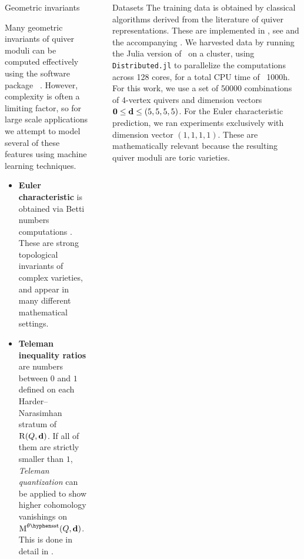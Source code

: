 \documentclass[final,20pt]{beamer}
\newlength{\sepwidth}
\newlength{\colwidth}
\newcommand{\separatorcolumn}{\begin{column}{\sepwidth}\end{column}}
\begin{document}
\begin{frame}[t]
\begin{columns}[t]
\begin{column}{\colwidth}
  \begin{alertblock}{Geometric invariants}

    Many geometric invariants of quiver moduli can be computed effectively
    using the software package \quivertools~\cite{quivertools,2506.19432}.
    However, complexity is often a limiting factor,
    so for large scale applications we attempt to model
    several of these features using machine learning techniques.

    \begin{itemize}
      \item \textbf{Euler characteristic} is obtained
      via Betti numbers computations \cite{MR1974891}.
      These are strong topological invariants of complex varieties,
      and appear in many different mathematical settings.

      \item \textbf{Teleman inequality ratios} are numbers between $0$ and $1$ defined
      on each Harder--Narasimhan stratum of $\operatorname{R}(Q,\mathbf{d})$.
      If all of them are strictly smaller than $1$,
      \emph{Teleman quantization} can be applied to show higher cohomology vanishings
      on $\modulispace^{\theta\semistable}(Q,\tuple{d})$.
      This is done in detail in \cite{2311.17003}.
    \end{itemize}

  \end{alertblock}
\end{column}

\separatorcolumn

\begin{column}{\colwidth}


  \begin{block}{Datasets}
    The training data is obtained by classical algorithms derived from
    the literature of quiver representations. These are implemented in
    \quivertools, see \cite{quivertools} and the accompanying \cite{2506.19432}.
    We harvested data by running the Julia version of \quivertools~on a cluster,
    using {\tt{Distributed.jl}} to parallelize the computations across 128 cores,
    for a total CPU time of ~1000h.
    For this work, we use a set of 50000 combinations of 4-vertex quivers
    and dimension vectors $\mathbf{0} \leq \mathbf{d}\leq(5, 5, 5, 5)$.
    For the Euler characteristic prediction, we ran experiments
    exclusively with dimension vector $(1, 1, 1, 1)$.
    These are mathematically relevant because the resulting quiver moduli
    are toric varieties.
  \end{block}


\end{column}
\end{columns}
\end{frame}
\end{document}
